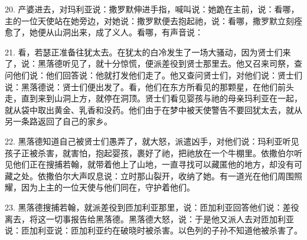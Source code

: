 20. 产婆进去，对玛利亚说：撒罗默伸进手指，喊叫说：她跪在主前，说：看哪，主的一位天使站在她旁边，对她说：撒罗默便去抱起祂，说：看哪，撒罗默立刻痊愈了，她便从山洞出来，成了义人。看哪，有声音说：\par

21. 看，若瑟正准备往犹太去。在犹太的白冷发生了一场大骚动，因为贤士们来了，说：黑落德听见了，就十分惊慌，便派差役到贤士那里去。他又召来司祭，查问他们说：他们回答说：他就打发他们走了。他又查问贤士们，对他们说：贤士们说：黑落德说：贤士们便出发了。看，他们在东方所看见的那颗星，在他们前头走，直到来到山洞上方，就停在洞顶。贤士们看见婴孩与祂的母亲玛利亚在一起，就从袋中取出黄金、乳香和没药。他们由于在梦中被天使警告不要回犹太去，就从另一条路返回了自己的家乡。\par

22. 黑落德知道自己被贤士们愚弄了，就大怒，派遣凶手，对他们说：玛利亚听见孩子正被杀害，就害怕，抱起婴孩，裹好了祂，把祂放在一个牛棚里。依撒伯尔听见他们正在搜捕若翰，就带着他上了山地，一直寻找可以藏匿他的地方，却没有可藏之处。依撒伯尔大声叹息说：立时那山裂开，收纳了她。有一道光在他们周围照耀，因为上主的一位天使与他们同在，守护着他们。\par

23. 黑落德搜捕若翰，就派差役到匝加利亚那里，说：匝加利亚回答他们说：差役离去，将这一切事报告给黑落德。黑落德大怒，说：于是他又派人去对匝加利亚说：匝加利亚说：匝加利亚约在破晓时被杀害。以色列的子孙不知道他被杀害了。\par

